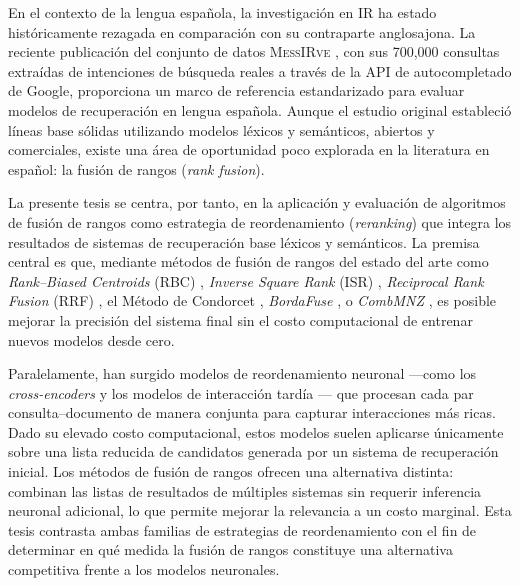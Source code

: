 \documentclass[12pt]{article}
\begin{document}
    En el contexto de la lengua española, la investigación en IR ha estado históricamente rezagada en comparación con su contraparte anglosajona. La reciente publicación del conjunto de datos \textsc{MessIRve} \parencite{valentini-etal-2025-messirve}, con sus 700,000 consultas extraídas de intenciones de búsqueda reales a través de la API de autocompletado de Google, proporciona un marco de referencia estandarizado para evaluar modelos de recuperación en lengua española. Aunque el estudio original \parencite{valentini-etal-2025-messirve} estableció líneas base sólidas utilizando modelos léxicos y semánticos, abiertos y comerciales, existe una área de oportunidad poco explorada en la literatura en español: la fusión de rangos (\textit{rank fusion}).
    
    La presente tesis se centra, por tanto, en la aplicación y evaluación de algoritmos de fusión de rangos como estrategia de reordenamiento (\textit{reranking}) que integra los resultados de sistemas de recuperación base léxicos y semánticos.
    La premisa central es que, mediante métodos de fusión de rangos del estado del arte como \textit{Rank--Biased Centroids} (RBC) \parencite{rbc10.1145/3077136.3080839}, \textit{Inverse Square Rank} (ISR) \parencite{mourao2015multimodal}, \textit{Reciprocal Rank Fusion} (RRF) \parencite{10.1145/1571941.1572114}, el Método de Condorcet \parencite{10.1145/584792.584881}, \textit{BordaFuse} \parencite{10.1145/383952.384007}, o \textit{CombMNZ} \parencite{fox1994combination}, es posible mejorar la precisión del sistema final sin el costo computacional de entrenar nuevos modelos desde cero. 
	
	Paralelamente, han surgido modelos de reordenamiento neuronal ---como los \textit{cross-encoders} \parencite{nogueira2019passage} y los modelos de interacción tardía \parencite{colbert10.1145/3397271.3401075}--- que procesan cada par consulta--documento de manera conjunta para capturar interacciones más ricas. Dado su elevado costo computacional, estos modelos suelen aplicarse únicamente sobre una lista reducida de candidatos generada por un sistema de recuperación inicial. Los métodos de fusión de rangos ofrecen una alternativa distinta: combinan las listas de resultados de múltiples sistemas sin requerir inferencia neuronal adicional, lo que permite mejorar la relevancia a un costo marginal. Esta tesis contrasta ambas familias de estrategias de reordenamiento con el fin de determinar en qué medida la fusión de rangos constituye una alternativa competitiva frente a los modelos neuronales.
    
\end{document}
